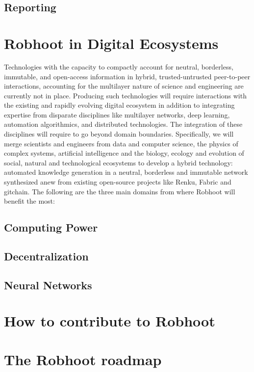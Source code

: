 \documentclass[10pt, a4paper, twocolumn]{article} %
\begin{document}
  \subsection{Reporting}

  
  \section{Robhoot in Digital Ecosystems}
  Technologies with the capacity to compactly account for neutral,
  borderless, immutable, and open-access information in hybrid,
  trusted-untrusted peer-to-peer interactions, accounting for the
  multilayer nature of science and engineering are currently not in
  place. Producing such technologies will require interactions with
  the existing and rapidly evolving digital ecosystem in addition to
  integrating expertise from disparate disciplines like multilayer
  networks, deep learning, automation algorithmics, and distributed
  technologies. The integration of these disciplines will require to
  go beyond domain boundaries. Specifically, we will merge scientists
  and engineers from data and computer science, the physics of complex
  systems, artificial intelligence and the biology, ecology and
  evolution of social, natural and technological ecosystems to develop
  a hybrid technology: automated knowledge generation in a neutral,
  borderless and immutable network synthesized anew from existing
  open-source projects like Renku, Fabric and gitchain. The following
  are the three main domains from where Robhoot will benefit the most:
\subsection{Computing Power}
\subsection{Decentralization}
\subsection{Neural Networks}

\section{How to contribute to Robhoot}

\newpage
\section{The Robhoot roadmap}
\end{document}
